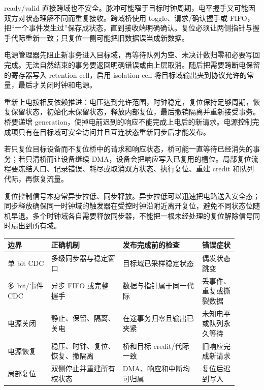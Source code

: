 ready/valid 直接跨域也不安全。脉冲可能窄于目标时钟周期，电平握手又可能因双方对状态理解不同而重复接收。跨域桥使用 toggle、请求/确认握手或 FIFO，把“一个事件发生过”保存成状态，直到接收端明确确认。复位必须让两侧指针与握手代际重新一致；只复位一侧可能把旧数据误当成新数据。


电源管理器先阻止新事务进入目标域，再等待队列为空、未决计数归零和必要写回完成。无法自然结束的事务要返回明确错误或由上层取消。随后把需要跨断电保留的寄存器写入 retention cell，启用 isolation cell 将目标域输出夹到协议允许的常量，最后才关闭时钟和电源。

重新上电按相反依赖推进：电压达到允许范围，时钟稳定，复位保持足够周期，恢复保留状态，初始化未保留状态，释放内部复位，最后撤销隔离并重新接受事务。桥要递增 generation，使掉电前迟到的响应不能完成上电后的新请求。电源控制完成项只有在目标域可安全访问并且互连状态重新同步后才能发布。


若只复位目标设备而不复位桥中的请求和响应状态，桥可能一直等待已经消失的事务；若只清桥而让设备继续 DMA，设备会把响应写入已复用的槽位。局部复位流程要冻结入口、记录错误、耗尽或取消双方状态、执行复位、重建 credit 和队列代际，再恢复流量。

复位控制信号本身常异步拉低、同步释放。异步拉低可以迅速把电路送入安全态；同步释放确保同一时钟域的触发器在受控时钟沿附近离开复位，避免不同状态位随机早退。多个时钟域各自需要释放同步器，不能把一根未经处理的复位解除信号同时扇出到所有域。

\begin{longtable}{L{0.17\linewidth}L{0.28\linewidth}L{0.31\linewidth}L{0.14\linewidth}}
\toprule
边界 & 正确机制 & 发布完成前的检查 & 错误症状 \\
\midrule
单 bit CDC & 多级同步器与稳定窗口 & 目标域已采样稳定状态 & 偶发状态跳变 \\\tablerowrule
多 bit/事件 CDC & 异步 FIFO 或完整握手 & 数据与指针属于同一代际 & 丢事件、重复或撕裂数据 \\\tablerowrule
电源关闭 & 静止、保留、隔离、关电 & 在途事务归零且输出已夹紧 & 未知电平或队列永久等待 \\\tablerowrule
电源恢复 & 稳压、时钟、复位、恢复、撤隔离 & 桥和目标 credit/代际一致 & 旧响应完成新请求 \\\tablerowrule
局部复位 & 双侧停止并重建所有权状态 & DMA、响应和中断均可归属 & 复位后迟到写入 \\
\bottomrule
\end{longtable}
